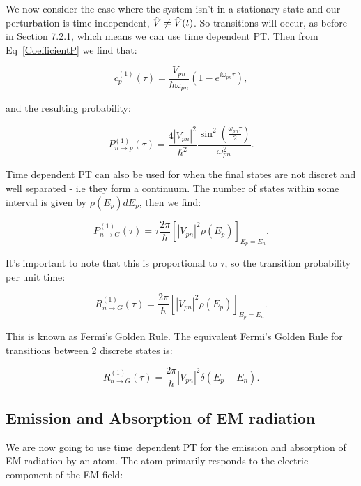 \noindent We now consider the case where the system isn't in a stationary state and our perturbation is time independent, $\Hat{V} \neq \Hat{V}(t)$. So transitions will occur, as before in Section 7.2.1, which means we can use time dependent PT. Then from Eq~\ref{CoefficientP} we find that:

\begin{equation}
    c^{(1)}_p(\tau) = \frac{V_{pn}}{\hbar \omega_{pn}} (1 - e^{i \omega_{pn} \tau}),
\end{equation}

\noindent and the resulting probability:

\begin{equation}
    P^{(1)}_{n \rightarrow p}(\tau) = \frac{4 |V_{pn}|^2}{\hbar^2} \frac{\sin^2(\frac{\omega_{pn} \tau}{2})}{\omega_{pn}^2}.
\end{equation}

\noindent Time dependent PT can also be used for when the final states are not discret and well separated - i.e they form a continuum. The number of states within some interval is given by $\rho(E_p) dE_p$, then we find:

\begin{equation}
    P^{(1)}_{n \rightarrow G}(\tau) = \tau \frac{2\pi}{\hbar}[|V_{pn}|^2 \rho(E_p)]_{E_p = E_n}.
\end{equation}

\noindent It's important to note that this is proportional to $\tau$, so the transition probability per unit time:

\begin{equation}
    R^{(1)}_{n \rightarrow G}(\tau) = \frac{2\pi}{\hbar}[|V_{pn}|^2 \rho(E_p)]_{E_p = E_n}.
    \label{FermiGoldenRuleContinuum}
\end{equation}

This is known as Fermi's Golden Rule. The equivalent Fermi's Golden Rule for transitions between 2 discrete states is:

\begin{equation}
    R^{(1)}_{n \rightarrow G}(\tau) = \frac{2\pi}{\hbar}|V_{pn}|^2 \delta(E_p - E_n).
\end{equation}

\subsection{Emission and Absorption of EM radiation}

We are now going to use time dependent PT for the emission and absorption of EM radiation by an atom. The atom primarily responds to the electric component of the EM field:

